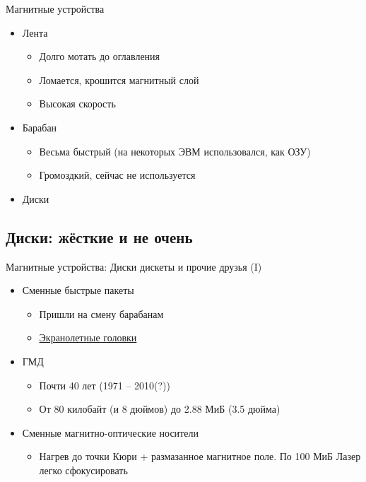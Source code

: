 \documentclass[xetex,aspectratio=43]{beamer}
\begin{document}
\begin{frame}{Магнитные устройства}

\begin{itemize}
\tightlist
\item
  Лента

  \begin{itemize}
  \tightlist
  \item
    Долго мотать до оглавления
  \item
    Ломается, крошится магнитный слой
  \item
    Высокая скорость
  \end{itemize}
\item
  Барабан

  \begin{itemize}
  \tightlist
  \item
    Весьма быстрый (на некоторых ЭВМ использовался, как ОЗУ)
  \item
    Громоздкий, сейчас не используется
  \end{itemize}
\item
  Диски
\end{itemize}
\end{frame}

\subsection{Диски: жёсткие и не очень}

\begin{frame}{Магнитные устройства: Диски дискеты и прочие друзья (I)}
\begin{itemize}
\tightlist
\item
  Сменные быстрые пакеты

  \begin{itemize}
  \tightlist
  \item
    Пришли на смену барабанам
  \item
    \href{http://www.ixbt.com/storage/hdd50years.shtml}{Экранолетные
    головки}
  \end{itemize}
\item
  ГМД

  \begin{itemize}
  \tightlist
  \item
    Почти 40 лет (1971 -- 2010(?))
  \item
    От 80 килобайт (и 8 дюймов) до 2.88 МиБ (3.5 дюйма)
  \end{itemize}
\item
  Сменные магнитно-оптические носители

  \begin{itemize}
  \tightlist
  \item
    Нагрев до точки Кюри + размазанное магнитное поле. По 100 МиБ Лазер
    легко сфокусировать
  \end{itemize}
\end{itemize}
\end{frame}
\end{document}
